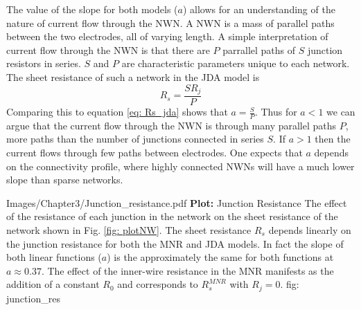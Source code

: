 The value of the slope for both models ($a$) allows for an understanding of the nature of current flow through the NWN. A NWN is a mass of parallel paths between the two electrodes, all of varying length. A simple interpretation of current flow through the NWN is that there are $P$ parrallel paths of $S$ junction resistors in series. $S$ and $P$ are characteristic parameters unique to each network. The sheet resistance of such a network in the JDA model is 
\begin{equation}
R_s = \frac{S R_j}{P} 
\end{equation}
Comparing this to equation \ref{eq: Rs_jda} shows that $a = \frac{S}{P}$. Thus for $a<1$ we can argue that the current flow through the NWN is through many parallel paths $P$, more paths than the number of junctions connected in series $S$. If $a>1$ then the current flows through few paths between electrodes. One expects that $a$ depends on the connectivity profile, where highly connected NWNs will have a much lower slope than sparse networks.

{Images/Chapter3/Junction_resistance.pdf}
{\textbf{Plot:} Junction Resistance}
{The effect of the resistance of each junction in the network on the sheet resistance of the network shown in Fig. \ref{fig: plotNW}. The sheet resistance $R_s$ depends linearly on the junction resistance for both the MNR and JDA models. In fact the slope of both linear functions ($a$) is the approximately the same for both functions at $a \approx 0.37$. The effect of the inner-wire resistance in the MNR manifests as the addition of a constant $R_0$ and corresponds to $R_s^{MNR}$ with $R_j = 0$.}
{fig: junction_res}


